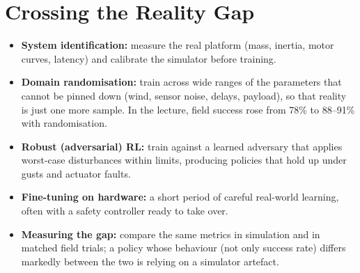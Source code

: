 \documentclass[11pt]{article}
\begin{document}
\section{Crossing the Reality Gap}
\begin{itemize}
\item \textbf{System identification:} measure the real platform (mass, inertia, motor curves, latency) and calibrate the simulator before training.
\item \textbf{Domain randomisation:} train across wide ranges of the parameters that cannot be pinned down (wind, sensor noise, delays, payload), so that reality is just one more sample. In the lecture, field success rose from 78\% to 88--91\% with randomisation.
\item \textbf{Robust (adversarial) RL:} train against a learned adversary that applies worst-case disturbances within limits, producing policies that hold up under gusts and actuator faults.
\item \textbf{Fine-tuning on hardware:} a short period of careful real-world learning, often with a safety controller ready to take over.
\item \textbf{Measuring the gap:} compare the same metrics in simulation and in matched field trials; a policy whose behaviour (not only success rate) differs markedly between the two is relying on a simulator artefact.
\end{itemize}
\end{document}
